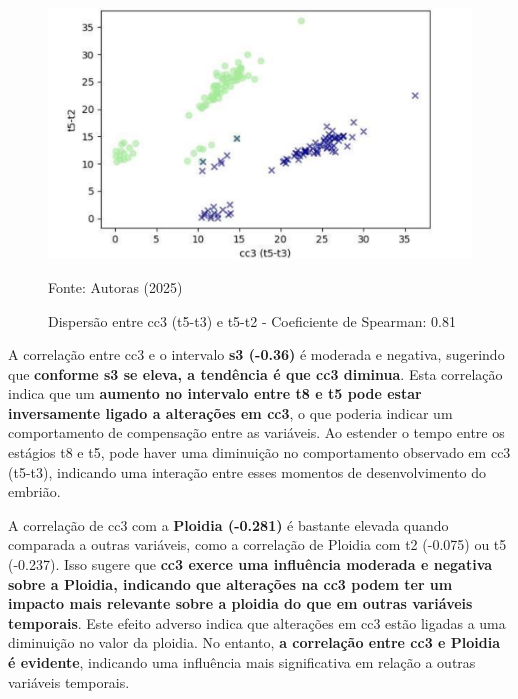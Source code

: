 \begin{figure}[h]
    \captionsetup{font=footnotesize, justification=centering, labelsep=period, position=above}
    \caption{Dispersão entre cc3 (t5-t3) e t5-t2 - Coeficiente de Spearman: 0.81}
    \label{fig:cc3-t5-t2}
    \centering
    \includegraphics[scale=0.5]{figuras/Spearman/cc3-t5-t2.pdf}
    \vspace{0.3cm} 
    \begin{minipage}{\linewidth}
        \centering
        \scriptsize{Fonte: Autoras (2025)}
    \end{minipage}
\end{figure}
\FloatBarrier

A correlação entre cc3 e o intervalo \textbf{s3 (-0.36)} é moderada e negativa, sugerindo que \textbf{conforme s3 se eleva, a tendência é que cc3 diminua}. Esta correlação indica que um \textbf{aumento no intervalo entre t8 e t5 pode estar inversamente ligado a alterações em cc3}, o que poderia indicar um comportamento de compensação entre as variáveis. Ao estender o tempo entre os estágios t8 e t5, pode haver uma diminuição no comportamento observado em cc3 (t5-t3), indicando uma interação entre esses momentos de desenvolvimento do embrião.

A correlação de cc3 com a \textbf{Ploidia (-0.281)} é bastante elevada quando comparada a outras variáveis, como a correlação de Ploidia com t2 (-0.075) ou t5 (-0.237). Isso sugere que \textbf{cc3 exerce uma influência moderada e negativa sobre a Ploidia, indicando que alterações na cc3 podem ter um impacto mais relevante sobre a ploidia do que em outras variáveis temporais}. Este efeito adverso indica que alterações em cc3 estão ligadas a uma diminuição no valor da ploidia. No entanto, \textbf{a correlação entre cc3 e Ploidia é evidente}, indicando uma influência mais significativa em relação a outras variáveis temporais.

